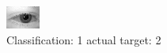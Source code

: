 \begin{figure}[h!]
\begin{center}
\includegraphics[width=0.60\columnwidth]{figures/ID417_class_1_target_2.png}
\end{center}
\caption{ Classification: 1 actual target: 2}
\label{fig:ID417_class_1_target_2}
\end{figure}

